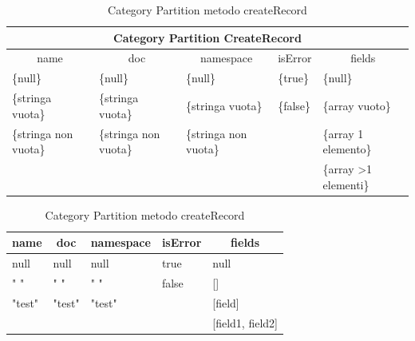 \documentclass[12pt, a4paper]{article}
\begin{document}

\begin{table}[ht]
  \centering
  \caption[Schema - Category Partition]{Category Partition metodo createRecord}
  \begin{tabular}{|l|l|l|l|l|}
  \hline
  \multicolumn{5}{|c|}{Category Partition CreateRecord}\\
  \hline
  \multicolumn{1}{|c|}{name} & \multicolumn{1}{|c|}{doc} & \multicolumn{1}{|c|}{namespace} & 
  \multicolumn{1}{|c|}{isError} & \multicolumn{1}{|c|}{fields} \\
  \hline
  \{null\} & \{null\} & \{null\} & \{true\} & \{null\} \\
  \{stringa vuota\} & \{stringa vuota\} & \{stringa vuota\} & \{false\} & \{array vuoto\} \\
  \{stringa non vuota\} & \{stringa non vuota\} & \{stringa non vuota\} & & \{array 1 elemento\} \\
  & & & & \{array \textgreater 1 elementi\} \\
  \hline
  \end{tabular}
  \label{tab:categoryPartitionCreateRecord}
\end{table}

\begin{table}[ht]
  \centering
  \caption[Schema - Category Partition]{Category Partition metodo createRecord}
  \begin{tabular}{|l|l|l|l|l|}
  \hline
  \multicolumn{1}{|c|}{\textbf{name}} & \multicolumn{1}{|c|}{\textbf{doc}} & \multicolumn{1}{|c|}{\textbf{namespace}} & 
  \multicolumn{1}{|c|}{\textbf{isError}} & \multicolumn{1}{|c|}{\textbf{fields}} \\
  \hline
  null & null & null & true & null \\
  \hdashline[4pt/2pt]
  " " & " " & " " & false & [] \\
  \hdashline[4pt/2pt]
  "test" & "test" & "test" & & [field] \\
  \hdashline[4pt/2pt]
  & & & & [field1, field2] \\
  \hline
  \end{tabular}
  \label{tab:BoundaryAnalysisCreateRecord}
\end{table}
\end{document}
